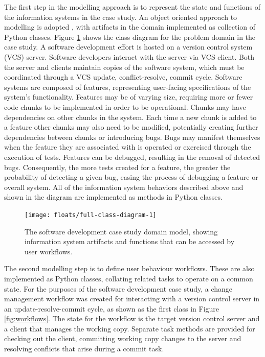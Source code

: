 \documentclass{llncs}
\begin{document}
The first step in the modelling approach is to represent the state and functions of the information systems in the case
study. An object oriented approach to modelling is adopted \cite{bennett06object}, with artifacts in the domain
implemented as collection of Python classes.  Figure \ref{fig:domain} shows the class diagram for the problem domain in
the case study.  A software development effort is hosted on a version control system (VCS) server.  Software developers
interact with the server via VCS client.  Both the server and clients maintain copies of the software system, which must
be coordinated through a VCS update, conflict-resolve, commit cycle.  Software systems are composed of features,
representing user-facing specifications of the system's functionality.  Features may be of varying size, requiring more
or fewer code chunks to be implemented in order to be operational.  Chunks may have dependencies on other chunks in the
system.  Each time a new chunk is added to a feature other chunks may also need to be modified, potentially creating
further dependencies between chunks or introducing bugs.  Bugs may manifest themselves when the feature they are
associated with is operated or exercised through the execution of tests.  Features can be debugged, resulting in the
removal of detected bugs.  Consequently, the more tests created for a feature, the greater the probability of detecting
a given bug, easing the process of debugging a feature or overall system. All of the information system behaviors
described above and shown in the diagram are implemented as methods in Python classes.

\begin{figure}[t]
  \centering
  \texttt{[image: floats/full-class-diagram-1]}
  \caption{The software development case study domain model, showing information system artifacts and functions that can
    be accessed by user workflows.}
  \label{fig:domain}

\end{figure}


The second modelling step is to define user behaviour workflows. These are also implemented as Python classes, collating
related tasks to operate on a common state. For the purposes of the software development case study, a change management
workflow was created for interacting with a version control server in an update-resolve-commit cycle, as shown as the
first class in Figure \ref{fig:workflows}.  The state for the workflow is the target version control server and a client
that manages the working copy.  Separate task methods are provided for checking out the client, committing working copy
changes to the server and resolving conflicts that arise during a commit task.
\end{document}
